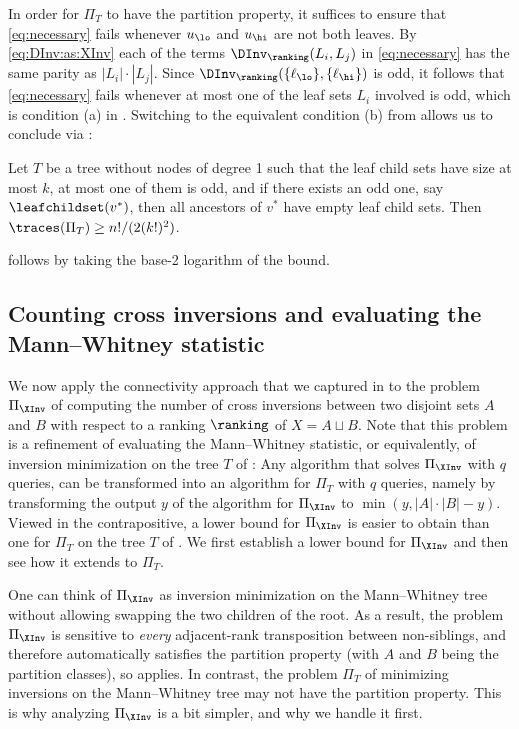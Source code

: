 \documentclass{toc}
\begin{document}
In order for $\Pi_T$ to have the partition property, it suffices to ensure that \eqref{eq:necessary} fails whenever $u_\lo$ and $u_\hi$ are not both leaves. By \eqref{eq:DInv:as:XInv} each of the terms $\DInv_\ranking(L_i,L_j)$ in \eqref{eq:necessary} has the same parity as $|L_i| \cdot |L_j|$. Since $\DInv_\ranking(\{\ell_\lo\},\{\ell_\hi\})$ is odd, it follows that \eqref{eq:necessary} fails whenever at most one of the leaf sets $L_i$ involved is odd, which is condition (a) in . Switching to the equivalent condition (b) from  allows us to conclude via :
\begin{theorem}
Let $T$ be a tree without nodes of degree 1 such that the leaf child sets have size at most $k$, at most one of them is odd, and if there exists an odd one, say $\leafchildset(v^*)$, then all ancestors of $v^*$ have empty leaf child sets. Then $\traces(\Pi_T) \ge n!/(2(k!)^2)$.
\end{theorem}
 follows by taking the base-2 logarithm of the bound.

\subsection{Counting cross inversions and evaluating the Mann--Whitney statistic}
\label{sec:connectivity:cross-inversions}

We now apply the connectivity approach that we captured in  to the problem $\Pi_{\XInv}$ of computing the number of cross inversions between two disjoint sets $A$ and $B$ with respect to a ranking $\ranking$ of $X = A \sqcup B$. Note that this problem is a refinement of evaluating the Mann--Whitney statistic, or equivalently, of inversion minimization on the tree $T$ of : Any algorithm that solves $\Pi_{\XInv}$ with $q$ queries, can be transformed into an algorithm for $\Pi_T$ with $q$ queries, namely by transforming the output $y$ of the algorithm for $\Pi_{\XInv}$ to $\min(y,|A| \cdot |B|-y)$. Viewed in the contrapositive, a lower bound for $\Pi_{\XInv}$ is easier to obtain than one for $\Pi_T$ on the tree $T$ of . We first establish a lower bound for $\Pi_{\XInv}$ and then see how it extends to $\Pi_T$.

One can think of $\Pi_{\XInv}$ as inversion minimization on the Mann--Whitney tree without allowing swapping the two children of the root. As a result, the problem $\Pi_{\XInv}$ is sensitive to \emph{every} adjacent-rank transposition between non-siblings, and therefore automatically satisfies the partition property (with $A$ and $B$ being the partition classes), so  applies. In contrast, the problem $\Pi_T$ of minimizing inversions on the Mann--Whitney tree may not have the partition property. This is why analyzing $\Pi_{\XInv}$ is a bit simpler, and why we handle it first.
\end{document}

